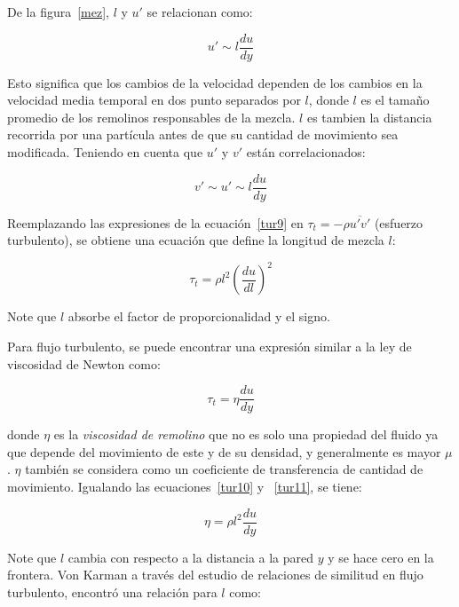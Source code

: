 \documentclass[11pt, oneside]{article}
\begin{document}
De la figura~\ref{mez}, $l$ y $u'$ se relacionan como:

\begin{equation}
u' \sim l \frac{du}{dy}
\label{tur8}
\end{equation}

Esto significa que los cambios de la velocidad dependen de los cambios en la velocidad media temporal en dos punto separados por $l$, donde $l$  es el tama\~no promedio de los remolinos responsables de la mezcla. $l$ es tambien la distancia recorrida por una part\'icula antes de que su cantidad de movimiento sea modificada. Teniendo en cuenta que $u'$ y $v'$ est\'an correlacionados:

\begin{equation}
v' \sim u' \sim l \frac{du}{dy}
\label{tur9}
\end{equation}

Reemplazando las expresiones de la ecuaci\'on~\ref{tur9} en $\tau_t = -\rho \overline{u' v'}$ (esfuerzo turbulento), se obtiene una ecuaci\'on que define la longitud de mezcla $l$:

\begin{equation}
\tau_t = \rho l^2 \left( \frac{du}{dl} \right)^2
\label{tur10}
\end{equation}

Note que $l$ absorbe el factor de proporcionalidad y el signo. 

Para flujo turbulento, se puede encontrar una expresi\'on similar a la ley de viscosidad de Newton como:

\begin{equation}
\tau_t = \eta\frac{du}{dy}
\label{tur11}
\end{equation}

donde $\eta$ es la \emph{viscosidad de remolino} que no es solo una propiedad del fluido ya que depende del movimiento de este y de su densidad, y generalmente es mayor $\mu$. $\eta$ tambi\'en se considera como un coeficiente de transferencia de cantidad de movimiento. Igualando las ecuaciones~\ref{tur10} y ~\ref{tur11}, se tiene:

\begin{equation}
\eta=\rho l^2 \frac{du}{dy}
\label{tur12}
\end{equation}

Note que $l$ cambia con respecto a la distancia a la pared $y$ y se hace cero en la frontera. Von Karman a trav\'es del estudio de relaciones de similitud en flujo turbulento, encontr\'o una relaci\'on para $l$ como:
\end{document}
